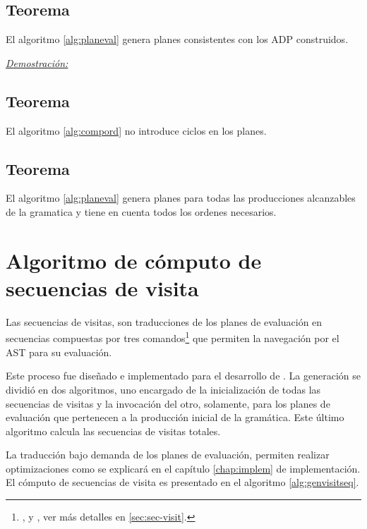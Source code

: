 \subsection{Teorema}
\label{teo:planes_plausibles}
El algoritmo \ref{alg:planeval} genera planes consistentes con los ADP construidos.


\underline{\emph{Demostración:}}

\subsection{Teorema}
\label{teo:ciclo_compute}
El algoritmo \ref{alg:compord} no introduce ciclos en los planes.

\subsection{Teorema}
\label{teo:reglas_alcan}
El algoritmo \ref{alg:planeval} genera planes para todas las producciones alcanzables de la gramatica y tiene en cuenta todos los ordenes \omega necesarios.

\section{Algoritmo de cómputo de secuencias de visita}
\label{sec:algseqvisit}

Las secuencias de visitas, son traducciones de los planes de evaluación en secuencias compuestas por tres comandos\footnote{,  y , ver más detalles en \ref{sec:sec-visit}.} que permiten la navegación por el AST para su evaluación.

Este proceso fue diseñado e implementado para el desarrollo de \maggen. La generación se dividió en dos algoritmos, uno encargado de la inicialización de todas las secuencias de visitas y la invocación del otro, solamente, para los planes de evaluación que pertenecen a la producción inicial de la gramática. Este último algoritmo calcula las secuencias de visitas totales.

La traducción bajo demanda de los planes de evaluación, permiten realizar optimizaciones como se explicará en el capítulo \ref{chap:implem} de implementación. El cómputo de secuencias de visita es presentado en el algoritmo \ref{alg:genvisitseq}.

